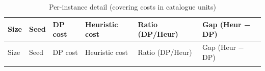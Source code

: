 \documentclass[
  11pt,
]{article}
\begin{document}
\begin{longtable}[]{@{}
  >{\raggedright\arraybackslash}p{}
  >{\raggedright\arraybackslash}p{}
  >{\raggedright\arraybackslash}p{}
  >{\raggedright\arraybackslash}p{}
  >{\raggedright\arraybackslash}p{}
  >{\raggedright\arraybackslash}p{}@{}}
\caption{Per-instance detail (covering costs in catalogue
units)}\tabularnewline
\toprule\noalign{}
\begin{minipage}[b]{\linewidth}\raggedright
Size
\end{minipage} & \begin{minipage}[b]{\linewidth}\raggedright
Seed
\end{minipage} & \begin{minipage}[b]{\linewidth}\raggedright
DP cost
\end{minipage} & \begin{minipage}[b]{\linewidth}\raggedright
Heuristic cost
\end{minipage} & \begin{minipage}[b]{\linewidth}\raggedright
Ratio (DP/Heur)
\end{minipage} & \begin{minipage}[b]{\linewidth}\raggedright
Gap (Heur − DP)
\end{minipage} \\
\midrule\noalign{}
\endfirsthead
\toprule\noalign{}
\begin{minipage}[b]{\linewidth}\raggedright
Size
\end{minipage} & \begin{minipage}[b]{\linewidth}\raggedright
Seed
\end{minipage} & \begin{minipage}[b]{\linewidth}\raggedright
DP cost
\end{minipage} & \begin{minipage}[b]{\linewidth}\raggedright
Heuristic cost
\end{minipage} & \begin{minipage}[b]{\linewidth}\raggedright
Ratio (DP/Heur)
\end{minipage} & \begin{minipage}[b]{\linewidth}\raggedright
Gap (Heur − DP)
\end{minipage} \\
\midrule\noalign{}

\end{longtable}
\end{document}
